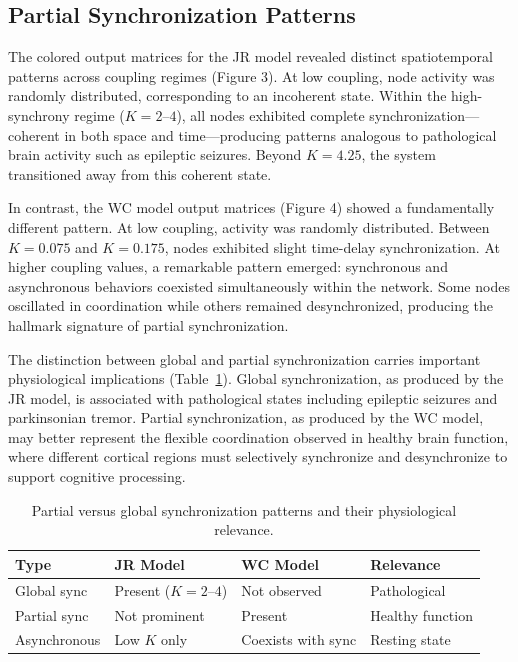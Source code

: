 \documentclass[12pt]{article}
\begin{document}
\subsection{Partial Synchronization Patterns}

The colored output matrices for the JR model revealed distinct spatiotemporal patterns across coupling regimes (Figure 3). At low coupling, node activity was randomly distributed, corresponding to an incoherent state. Within the high-synchrony regime ($K = 2$--$4$), all nodes exhibited complete synchronization---coherent in both space and time---producing patterns analogous to pathological brain activity such as epileptic seizures. Beyond $K = 4.25$, the system transitioned away from this coherent state.

In contrast, the WC model output matrices (Figure 4) showed a fundamentally different pattern. At low coupling, activity was randomly distributed. Between $K = 0.075$ and $K = 0.175$, nodes exhibited slight time-delay synchronization. At higher coupling values, a remarkable pattern emerged: synchronous and asynchronous behaviors coexisted simultaneously within the network. Some nodes oscillated in coordination while others remained desynchronized, producing the hallmark signature of partial synchronization.

The distinction between global and partial synchronization carries important physiological implications (Table~\ref{tab:partial_sync}). Global synchronization, as produced by the JR model, is associated with pathological states including epileptic seizures and parkinsonian tremor. Partial synchronization, as produced by the WC model, may better represent the flexible coordination observed in healthy brain function, where different cortical regions must selectively synchronize and desynchronize to support cognitive processing.

\begin{table}[H]
\centering
\caption{Partial versus global synchronization patterns and their physiological relevance.}
\label{tab:partial_sync}
\begin{tabular}{llll}
\toprule
Type & JR Model & WC Model & Relevance \\
\midrule
Global sync & Present ($K = 2$--$4$) & Not observed & Pathological \\
Partial sync & Not prominent & Present & Healthy function \\
Asynchronous & Low $K$ only & Coexists with sync & Resting state \\
\bottomrule
\end{tabular}
\end{table}
\end{document}
